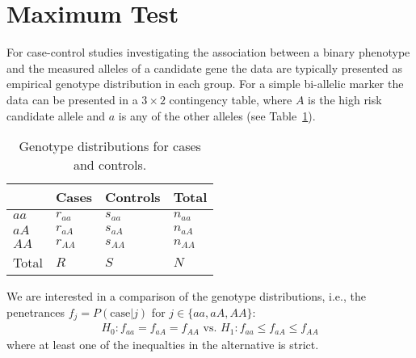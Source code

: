 \documentclass[bimj,fleqn]{w-art}
\begin{document}
\section{Maximum Test}

For case-control studies investigating the association between a binary phenotype 
and the measured alleles of a candidate gene the data are typically 
presented as empirical genotype distribution in each group. 
For a simple bi-allelic marker the data can be 
presented in a $3 \times 2$ contingency table, where $A$ is the 
high risk candidate allele and $a$ is any of the other alleles 
(see Table~\ref{gdistr}). 

\begin{table}
\begin{center}
\caption{Genotype distributions for cases and controls. \label{gdistr}}
\vspace*{0.5cm}
  \begin{tabular}{l l l l}
       & Cases & Controls & Total \\
 \hline
 $aa$       &       $r_{aa}$ & $s_{aa}$ & $n_{aa}$\\
 $aA$       &       $r_{aA}$ & $s_{aA}$ & $n_{aA}$ \\
 $AA$       &       $r_{AA}$ & $s_{AA}$ & $n_{AA}$ \\
 Total&         $R$     & $S$       & $N$  \\
  \hline
 \end{tabular}
\end{center}
 \end{table}


We are interested in a comparison of the genotype distributions, 
i.e., the penetrances $f_j = P(\text{case} | j)$ for $j \in \{aa, aA, AA\}$:
\begin{eqnarray*}
H_0: f_{aa} = f_{aA} = f_{AA} \text{ vs. } H_1: f_{aa} \le f_{aA} \le f_{AA}
\end{eqnarray*}
where at least one of the inequalties in the alternative is strict.
\end{document}
